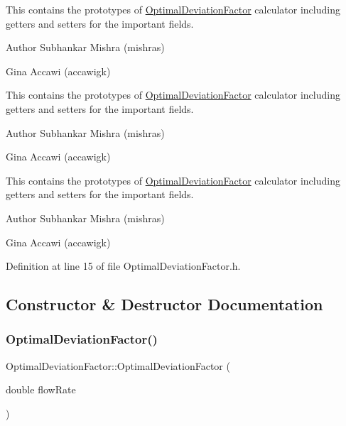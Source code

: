 This contains the prototypes of \hyperlink{class_optimal_deviation_factor}{Optimal\+Deviation\+Factor} calculator including getters and setters for the important fields.

\begin{DoxyAuthor}{Author}
Subhankar Mishra (mishras) 

Gina Accawi (accawigk) 
\end{DoxyAuthor}


This contains the prototypes of \hyperlink{class_optimal_deviation_factor}{Optimal\+Deviation\+Factor} calculator including getters and setters for the important fields.

\begin{DoxyAuthor}{Author}
Subhankar Mishra (mishras) 

Gina Accawi (accawigk) 
\end{DoxyAuthor}


This contains the prototypes of \hyperlink{class_optimal_deviation_factor}{Optimal\+Deviation\+Factor} calculator including getters and setters for the important fields.

\begin{DoxyAuthor}{Author}
Subhankar Mishra (mishras) 

Gina Accawi (accawigk) 
\end{DoxyAuthor}


Definition at line 15 of file Optimal\+Deviation\+Factor.\+h.



\subsection{Constructor \& Destructor Documentation}
\mbox{\label{class_optimal_deviation_factor_a61e6acfd31d44bc1f2f622407ba1e857}} 
\subsubsection{\texorpdfstring{Optimal\+Deviation\+Factor()}{OptimalDeviationFactor()}\hspace{0.1cm}{\footnotesize\ttfamily [1/3]}}
{\footnotesize\ttfamily Optimal\+Deviation\+Factor\+::\+Optimal\+Deviation\+Factor (\begin{DoxyParamCaption}\item[{double}]{flow\+Rate }\end{DoxyParamCaption})\hspace{0.3cm}{\ttfamily [inline]}}

